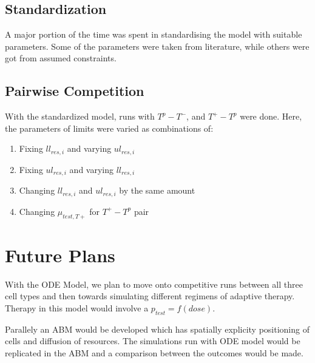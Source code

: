 \documentclass[11pt,a4paper]{article}
\begin{document}
\subsection{Standardization}
A major portion of the time was spent in standardising the model with suitable parameters. Some of the parameters were taken from literature, while others were got from assumed constraints.

\subsection{Pairwise Competition}
With the standardized model, runs with $T^p - T^-$, and $T^+ - T^p$ were done. Here, the parameters of limits were varied as combinations of:
\begin{enumerate}
  \item Fixing $ll_{res,i}$ and varying $ul_{res,i}$
  \item Fixing $ul_{res,i}$ and varying $ll_{res,i}$
  \item Changing $ll_{res,i}$ and $ul_{res,i}$ by the same amount
  \item Changing $\mu_{test,T+}$ for $T^+ - T^p$ pair
\end{enumerate}

\section{Future Plans}
With the ODE Model, we plan to move onto competitive runs between all three cell types and then towards simulating different regimens of adaptive therapy. Therapy in this model would involve a $p_{test} = f(dose)$.

Parallely an ABM would be developed which has spatially explicity positioning of cells and diffusion of resources. The simulations run with ODE model would be replicated in the ABM and a comparison between the outcomes would be made.

\printbibliography
\end{document}
